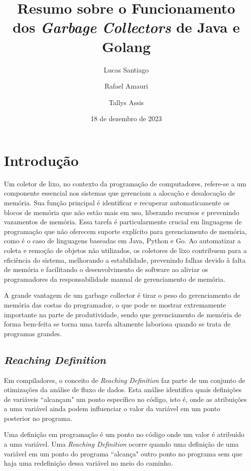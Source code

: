 \documentclass{article}
\title{Resumo sobre o Funcionamento dos \emph{Garbage Collectors} de Java e Golang}
\author{Lucas Santiago \and Rafael Amauri \and Tallys Assis}
\date{18 de dezembro de 2023}
\begin{document}
    \maketitle

    \section*{Introdução}

    Um coletor de lixo, no contexto da programação de computadores, refere-se a um componente essencial nos sistemas que gerenciam a
    alocação e desalocação de memória. Sua função principal é identificar e recuperar automaticamente os blocos de memória que
    não estão mais em uso, liberando recursos e prevenindo vazamentos de memória. Essa tarefa é particularmente crucial em
    linguagens de programação que não oferecem suporte explícito para gerenciamento de memória, como é o caso de linguagens
    baseadas em Java, Python e Go. Ao automatizar a coleta e remoção de objetos não utilizados, os coletores de lixo contribuem
    para a eficiência do sistema, melhorando a estabilidade, prevenindo falhas devido à falta de memória e facilitando o desenvolvimento
    de software ao aliviar os programadores da responsabilidade manual de gerenciamento de memória.

    A grande vantagem de um garbage collector é tirar o peso do gerenciamento de memória das costas do programador,
    o que pode se mostrar extremamente importante na parte de produtividade, sendo que gerenciamento de memória de forma bem-feita
    se torna uma tarefa altamente laboriosa quando se trata de programas grandes.

    \subsection*{\emph{Reaching Definition}}
    Em compiladores, o conceito de \textit{Reaching Definition} faz parte de um conjunto de otimizações da análise de fluxo de dados.
    Esta análise identifica quais definições de variáveis ``alcançam" um ponto específico no código, isto é,
    onde as atribuições a uma variável ainda podem influenciar o valor da variável em um ponto posterior no programa.

    Uma definição em programação é um ponto no código onde um valor é atribuído a uma variável.
    Uma \textit{Reaching Definition} ocorre quando uma definição de uma variável em um ponto do programa
    ``alcança" outro ponto no programa sem que haja uma redefinição dessa variável no meio do caminho.
\end{document}
